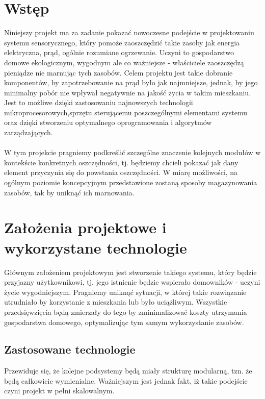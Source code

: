 \documentclass[12pt]{article} %
\begin{document}
\newpage %


\section{Wstęp} 

Niniejszy projekt ma za zadanie pokazać nowoczesne podejście w projektowaniu systemu sensorycznego, który pomoże zaoszczędzić takie zasoby jak energia elektryczna, prąd, ogólnie rozumiane ogrzewanie. Uczyni to gospodarstwo domowe ekologicznym, wygodnym ale co ważniejsze - właściciele zaoszczędzą pieniądze nie marnując tych zasobów. Celem projektu jest takie dobranie komponentów, by zapotrzebowanie na prąd było jak najmniejsze, jednak, by jego minimalny pobór nie wpływał negatywnie na jakość życia w takim mieszkaniu. Jest to możliwe dzięki zastosowaniu najnowszych technologii mikroprocesorowych,sprzętu sterującemu poszczególnymi elementami systemu oraz dzięki stworzeniu optymalnego oprogramowania i algorytmów zarządzających.
\\ \\
W tym projekcie pragniemy podkreślić szczególne znaczenie kolejnych modułów w kontekście konkretnych oszczędności, tj. będziemy chcieli pokazać jak dany element przyczynia się do powstania oszczędności. W miarę możliwości, na ogólnym poziomie koncepcyjnym przedstawione zostaną sposoby magazynowania zasobów, tak by uniknąć ich marnowania. 

\section{Założenia projektowe i wykorzystane technologie}
Głównym założeniem projektowym jest stworzenie takiego systemu, który będzie przyjazny użytkownikowi, tj. jego istnienie będzie wspierało domowników - uczyni życie wygodniejszym. Pragniemy uniknąć sytuacji, w której takie rozwiązanie utrudniało by korzystanie z mieszkania lub było uciążliwym. Wszystkie przedsięwzięcia będą zmierzały do tego by zminimalizować koszty utrzymania gospodarstwa domowego, optymalizując tym samym wykorzystanie zasobów.
\\
\subsection{Zastosowane technologie}
Przewiduje się, że kolejne podsystemy będą miały strukturę modularną, tzn. że będą całkowicie wymienialne. Ważniejszym jest jednak fakt, iż takie podejście czyni projekt w pełni skalowalnym.
\end{document}
